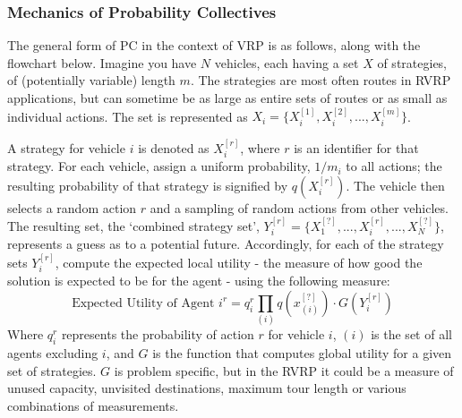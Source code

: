 \documentclass{sig-alternate}
\begin{document}
\subsubsection{Mechanics of Probability Collectives}
The general form of PC in the context of VRP is as follows, along with the flowchart below. Imagine you have $N$ vehicles, each having a set $X$ of strategies, of (potentially variable) length $m$. The strategies are most often routes in RVRP applications\cite{Vasirani:2008}, but can sometime be as large as entire sets of routes or as small as individual actions. The set is represented as $X_i=\{X_i^{[1]}, X_i^{[2]}, ..., X_i^{[m]}\}$. 

A strategy for vehicle $i$ is denoted as $X_i^{[r]}$, where $r$ is an identifier for that strategy. For each vehicle, assign a uniform probability, $1/m_i$ to all actions; the resulting probability of that strategy is signified by $q(X_i^{[r]})$. The vehicle then selects a random action $r$ and a sampling of random actions from other vehicles. The resulting set, the `combined strategy set', $Y_i^{[r]}=\{X_1^{[?]}, ...,X_i^{[r]}, ...,X_N^{[?]}\}$, represents a guess as to a potential future. Accordingly, for each of the strategy sets $Y_i^{[r]}$, compute the expected local utility - the measure of how good the solution is expected to be for the agent - using the following measure:
	\begin{equation}
	\textrm{Expected Utility of Agent } i^r =q_i^r\prod_{(i)}{q(x_{(i)}^{[?]})\cdot G(Y_i^{[r]})}
	\end{equation}
Where $q_i^r$ represents the probability of action $r$ for vehicle $i$, $(i)$ is the set of all agents excluding $i$, and $G$ is the function that computes global utility for a given set of strategies. $G$ is problem specific, but in the RVRP it could be a measure of unused capacity, unvisited destinations, maximum tour length or various combinations of measurements.
\end{document}
